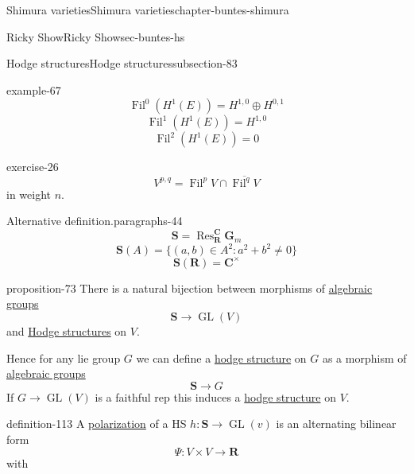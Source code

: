 \documentclass[oneside,10pt,]{book}
\numberwithin{equation}{section}
\newcommand{\RR}{\mathbf{R}}
\newcommand{\CC}{\mathbf{C}}
\DeclareMathOperator{\Fil}{Fil}
\DeclareMathOperator{\Res}{Res}
\DeclareMathOperator{\GL}{GL}
\begin{document}
\begin{chapterptx}{Shimura varieties}{}{Shimura varieties}{}{}{chapter-buntes-shimura}
\begin{sectionptx}{Ricky Show}{}{Ricky Show}{}{}{sec-buntes-hs}
\begin{subsectionptx}{Hodge structures}{}{Hodge structures}{}{}{subsection-83}
\begin{example}{}{example-67}
\begin{equation*}
\Fil^0(H^1(E)) = H^{1,0} \oplus H^{0,1}
\end{equation*}
%
\begin{equation*}
\Fil^1(H^1(E)) = H^{1,0}
\end{equation*}
%
\begin{equation*}
\Fil^2(H^1(E)) = 0
\end{equation*}
%
\end{example}
\begin{inlineexercise}{}{exercise-26}%
\hypertarget{p-1147}{}%
%
\begin{equation*}
V^{p,q} = \Fil^p V \cap \overline {\Fil^q V}
\end{equation*}
in weight \(n\).%
\end{inlineexercise}
\begin{paragraphs}{Alternative definition.}{paragraphs-44}%
\hypertarget{p-1148}{}%
%
\begin{equation*}
\mathbf S = \Res_\RR^\CC \mathbf G_m
\end{equation*}
%
\begin{equation*}
\mathbf S(A) = \{ (a,b) \in A^2 : a^2+  b^2 \ne 0\}
\end{equation*}
%
\begin{equation*}
\mathbf S(\RR) = \CC^\times
\end{equation*}
%
\begin{proposition}{}{}{proposition-73}%
\hypertarget{p-1149}{}%
There is  a natural bijection between morphisms of \hyperref[def-alg-gp]{algebraic groups}%
\begin{equation*}
\mathbf S \to \GL(V)
\end{equation*}
and \hyperref[def-hodge-str]{Hodge structures} on \(V\).%
\end{proposition}
\hypertarget{p-1150}{}%
Hence for any lie group \(G\) we can define a \hyperref[def-hodge-str]{hodge structure} on \(G\) as a morphism of \hyperref[def-alg-gp]{algebraic groups}%
\begin{equation*}
\mathbf S \to G
\end{equation*}
If \(G \to \GL(V)\) is a faithful rep this induces a \hyperref[def-hodge-str]{hodge structure} on \(V\).%
\begin{definition}{}{definition-113}%
\hypertarget{p-1151}{}%
A \hyperref[def-c-pol]{polarization} of a HS \(h\colon \mathbf S \to \GL(v)\) is an alternating bilinear form%
\begin{equation*}
\Psi \colon V\times V \to \RR
\end{equation*}
with\leavevmode%
\begin{enumerate}

\end{enumerate}
\end{definition}
\end{paragraphs}
\end{subsectionptx}
\end{sectionptx}
\end{chapterptx}
\end{document}
